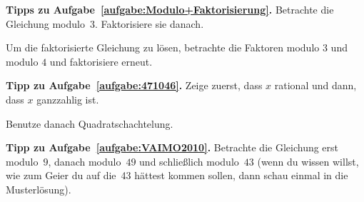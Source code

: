 \textbf{Tipps zu Aufgabe~\ref{aufgabe:Modulo+Faktorisierung}.} Betrachte die Gleichung modulo~$3$. Faktorisiere sie danach.

Um die faktorisierte Gleichung zu lösen, betrachte die Faktoren modulo $3$ und modulo $4$ und faktorisiere erneut.


\textbf{Tipp zu Aufgabe~\ref{aufgabe:471046}.} Zeige zuerst, dass $x$ rational und dann, dass $x$ ganzzahlig ist.

Benutze danach Quadratschachtelung.


\textbf{Tipp zu Aufgabe~\ref{aufgabe:VAIMO2010}.} Betrachte die Gleichung erst modulo~$9$, danach modulo~$49$ und schließlich modulo~$43$ (wenn du wissen willst, wie zum Geier du auf die~43 hättest kommen sollen, dann schau einmal in die Musterlösung).